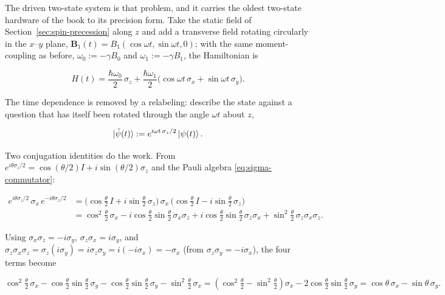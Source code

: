 The driven two-state system is that problem, and it carries the oldest two-state hardware of the book to its precision form. Take the static field of Section~\ref{sec:spin-precession} along $z$ and add a transverse field rotating circularly in the $x$--$y$ plane, $\bm B_1(t) = B_1(\cos\omega t, \sin\omega t, 0)$; with the same moment-coupling as before, $\omega_0 := -\gamma B_0$ and $\omega_1 := -\gamma B_1$, the Hamiltonian is
\begin{linenomath}
    \begin{equation*}
        H(t) = \frac{\hbar\omega_0}{2}\,\sigma_z + \frac{\hbar\omega_1}{2}\bigl(\cos\omega t\,\sigma_x + \sin\omega t\,\sigma_y\bigr) .
    \end{equation*}
\end{linenomath}
The time dependence is removed by a relabeling: describe the state against a question that has itself been rotated through the angle $\omega t$ about $z$,
\begin{linenomath}
    \begin{equation*}
        \ket{\tilde\psi(t)} := e^{i\omega t\,\sigma_z/2}\ket{\psi(t)} .
    \end{equation*}
\end{linenomath}
Two conjugation identities do the work. From $e^{i\theta\sigma_z/2} = \cos(\theta/2)I + i\sin(\theta/2)\sigma_z$ and the Pauli algebra \eqref{eq:sigma-commutator}:
\begin{linenomath}
    \begin{align*}
        e^{i\theta\sigma_z/2}\,\sigma_x\,e^{-i\theta\sigma_z/2}
        &= \bigl(\cos\tfrac{\theta}{2}\,I + i\sin\tfrac{\theta}{2}\,\sigma_z\bigr)\,\sigma_x\,
           \bigl(\cos\tfrac{\theta}{2}\,I - i\sin\tfrac{\theta}{2}\,\sigma_z\bigr) \\
        &= \cos^{2}\tfrac{\theta}{2}\,\sigma_x
           - i\cos\tfrac{\theta}{2}\sin\tfrac{\theta}{2}\,\sigma_x\sigma_z
           + i\cos\tfrac{\theta}{2}\sin\tfrac{\theta}{2}\,\sigma_z\sigma_x
           + \sin^{2}\tfrac{\theta}{2}\,\sigma_z\sigma_x\sigma_z .
    \end{align*}
\end{linenomath}
Using $\sigma_x\sigma_z = -i\sigma_y$, $\sigma_z\sigma_x = i\sigma_y$, and $\sigma_z\sigma_x\sigma_z = \sigma_z(i\sigma_y) = i\sigma_z\sigma_y = i(-i\sigma_x) = -\sigma_x$ (from $\sigma_z\sigma_y = -i\sigma_x$), the four terms become
\begin{linenomath}
    \begin{equation*}
        \cos^{2}\tfrac{\theta}{2}\,\sigma_x
        - \cos\tfrac{\theta}{2}\sin\tfrac{\theta}{2}\,\sigma_y
        - \cos\tfrac{\theta}{2}\sin\tfrac{\theta}{2}\,\sigma_y
        - \sin^{2}\tfrac{\theta}{2}\,\sigma_x
        = (\cos^{2}\tfrac{\theta}{2}-\sin^{2}\tfrac{\theta}{2})\sigma_x
          - 2\cos\tfrac{\theta}{2}\sin\tfrac{\theta}{2}\,\sigma_y
        = \cos\theta\,\sigma_x - \sin\theta\,\sigma_y .
    \end{equation*}
\end{linenomath}
